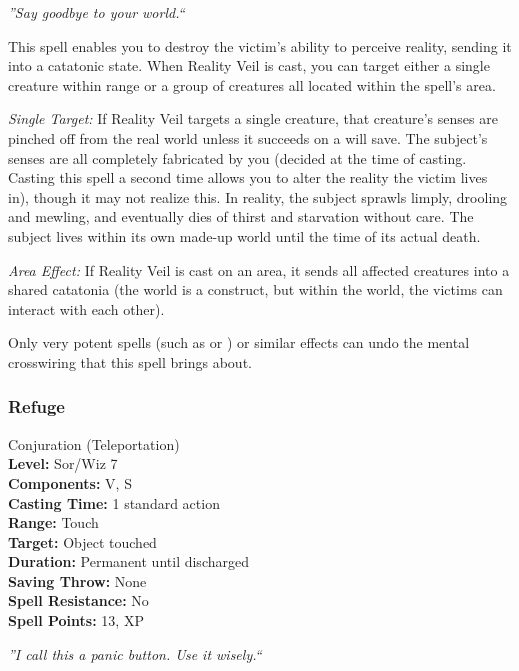 \emph{''Say goodbye to your world.``}

This spell enables you to destroy the victim's ability to perceive reality, sending it into a catatonic state.
When Reality Veil is cast, you can target either a single creature within range or a group of creatures all located within the spell's area.

\begin{list}{}{\leftmargin=1em}
 \item \emph{Single Target:}
If Reality Veil targets a single creature, 
that creature's senses are pinched off from the real world unless it succeeds on a will save. 
The subject's senses are all completely fabricated by you (decided at the time of casting. Casting this spell a second time allows you to alter the reality the victim lives in), 
though it may not realize this. 
In reality, the subject sprawls limply, drooling and mewling, and eventually dies of thirst and starvation without care.
The subject lives within its own made-up world until the time of its actual death.
 \item \emph{Area Effect:}
If Reality Veil is cast on an area, it sends all affected creatures into a shared catatonia (the world is a construct, but within the world, the victims can interact with each other). 
\end{list}
Only very potent spells (such as  or ) or similar effects can undo the mental crosswiring that this spell brings about. 
\subsubsection{Refuge}
\label{Spell:Refuge}
Conjuration (Teleportation)
\\ \textbf{Level:} Sor/Wiz 7
\\ \textbf{Components:} V, S
\\ \textbf{Casting Time:} 1 standard action
\\ \textbf{Range:} Touch
\\ \textbf{Target:} Object touched
\\ \textbf{Duration:} Permanent until discharged
\\ \textbf{Saving Throw:} None
\\ \textbf{Spell Resistance:} No
\\ \textbf{Spell Points:} 13, XP

\emph{''I call this a panic button. Use it wisely.``}

